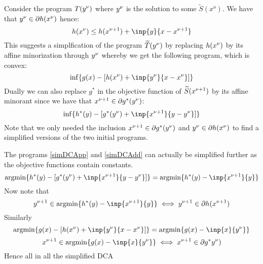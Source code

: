 Consider the program $T(y^{\nu})$ where $y^{\nu}$ is the solution
to some $\widetilde S(x^o)$. We have that $y^{\nu}\in\partial h(x^\nu)$ hence:
\begin{equation}
    h(\xs)\leq h(\xss) + \inp{y}{x-\xss} 
\end{equation}
This suggests a simplfication of the program $\widetilde T(y^{\nu})$ by replacing
$h(x^\nu)$ by its affine minorization through $y^{\nu}$ whereby we get the
following program, which is convex: 
\begin{equation}
    \inf\{g(x) - [h(\xs)+\inp{\ys}{x-\xs}] \}
    \label{simDCApp}
\end{equation}
Dually we can also replace $g^*$ in the objective function
of $\widetilde S(x^{\nu+1})$ by its affine minorant since we have that
$x^{\nu+1} \in \partial g^*(y^{\nu})$:
\begin{equation}
    \inf\{h^*(y)-[g^*(\ys) + \inp{\xss}{y-\ys}]\}
    \label{simDCAdd}
\end{equation}
Note that we only needed the inclusion $x^{\nu+1}\in\partial g^*(y^{\nu})$
and $y^{\nu}\in\partial h(x^\nu)$ to find a simplified versions of
the two initial programs.\\
\begin{comment}
Note that the simplified forms \eqref{simDCApp} and \eqref{simDCAdd}
are actually equivalent to the programs from \eqref{fulldca} if the functions 
$g^*$ and $h$ are actually essentially differentiable \autocite{tao2005dc}.
\end{comment}
\newpage
%
The programs \eqref{simDCApp} and \eqref{simDCAdd} can actually be simplified
further as the objective functions contain constants.
%
\begin{equation}
   \argmin\{h^*(y)-[g^*(\ys) + \inp{\xss}{y-\ys}]\}=
   \argmin\{h^*(y) -\inp{\xss}{y}\}
\end{equation}
Now note that 
\begin{equation}
  \yss \in \argmin\{h^*(y) -\inp{\xss}{y}\} \iff \yss \in \partial h(\xss)
\end{equation}
Similarly
\begin{equation}
    \argmin\{g(x) - [h(\xs)+\inp{\ys}{x-\xs}] \}=
   \argmin\{g(x) -\inp{x}{\ys}\}
\end{equation}
\begin{equation}
  \xss \in   \argmin\{g(x) -\inp{x}{\ys}\} \iff \xss \in \partial g^*\ys)
\end{equation}
Hence all in all the simplified DCA 
